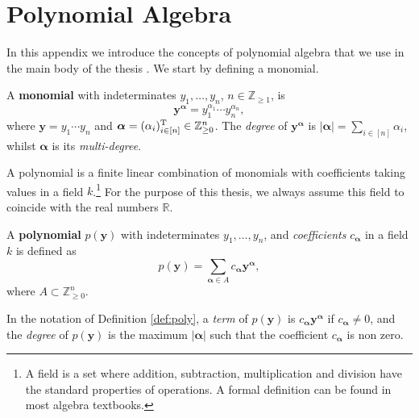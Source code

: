 
\chapter{Polynomial Algebra} %

\label{appendixC} %


In this appendix we introduce the concepts of polynomial algebra that we use in the main body of the thesis \citep[see e.g.][for more details]{Cox2007a}. We start by defining a monomial.

\begin{definition}
A \textbf{monomial} with indeterminates $y_1,\dots,y_n$, $n\in\mathbb{Z}_{\geq 1}$, is 
\begin{equation*}
\bm{y}^{\bm{\alpha}}=y_1^{\alpha_1}\cdots y_n^{\alpha_n},
\end{equation*}
where $\bm{y}=y_1\cdots y_n$ and $\bm{\alpha}=(\alpha_i)^{\textnormal{T}}_{i\in[n]}\in\mathbb{Z}_{\geq 0}^n$. The \emph{degree} of $\bm{y}^{\bm{\alpha}}$ is $|\bm{\alpha}|=\sum_{i\in[n]}\alpha_i$, whilst $\bm{\alpha}$ is its  \emph{multi-degree}.
\end{definition}

A polynomial is a finite linear combination of monomials with coefficients taking values in a field $k$.\footnote{A field is a set where addition, subtraction, multiplication and division have the standard properties of operations. A formal definition can be found in most algebra textbooks.} For the purpose of this thesis, we always assume this field to coincide with the real numbers $\mathbb{R}$. 

\begin{definition}
\label{def:poly}
A \textbf{polynomial} $p(\bm{y})$ with indeterminates $y_1,\dots,y_n$, and \emph{coefficients} $c_{\bm{\alpha}}$ in a field $k$ is defined as
\begin{equation*}
p(\bm{y})=\sum_{\bm{\alpha}\in A}c_{\bm{\alpha}}\bm{y}^{\bm{\alpha}},
\end{equation*}
where $A\subset \mathbb{Z}^{n}_{\geq 0}$. 
\end{definition}

\begin{definition}
In the notation of Definition \ref{def:poly}, a \emph{term} of $p(\bm{y})$ is $c_{\bm{\alpha}}\bm{y}^{\bm{\alpha}}$ if $c_{\bm{\alpha}}\neq 0$, and the \emph{degree} of $p(\bm{y})$ is the maximum $|\bm{\alpha}|$ such that the coefficient $c_{\bm{\alpha}}$ is non zero.
\end{definition}

